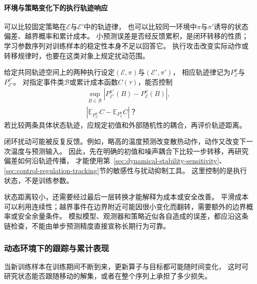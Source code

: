 \paragraph{环境与策略变化下的执行轨迹响应}
\label{sec:future-analysis-trajectory-perturbation}

可以比较固定策略在$\mathcal E$与$\mathcal E'$中的轨迹律，
也可以比较同一环境中$\pi$与$\pi'$诱导的状态偏差、越界概率和累计成本。
小预测误差是否经反馈累积，是闭环转移的性质；
学习参数序列对训练样本的稳定性本身不足以回答它。
执行攻击改变实际动作或转移规律时，也要在这类对象上规定扰动范围。

\begin{mathproblem}[闭环过程对环境与策略变化的响应]
  \label{question:future-trajectory-perturbation}
  给定共同轨迹空间上的两种执行设定$(\mathcal E,\pi)$与$(\mathcal E',\pi')$，
  相应轨迹律记为$P_{\mathcal E}^{\pi}$与$P_{\mathcal E'}^{\pi'}$。
  对指定事件类$\mathcal B$或累计成本函数$C(\tau)$，能否控制
  \[
    \begin{gathered}
      \sup_{B\in\mathcal B}
        |P_{\mathcal E'}^{\pi'}(B)-P_{\mathcal E}^{\pi}(B)|,\\
      |\mathbb E_{P_{\mathcal E'}^{\pi'}}C
       -\mathbb E_{P_{\mathcal E}^{\pi}}C|\text{？}
    \end{gathered}
  \]
  若比较两条具体状态轨迹，应规定初值和外部随机性的耦合，再评价轨迹距离。
\end{mathproblem}

闭环扰动可能被反复反馈。例如，略高的温度预测改变散热动作，动作又改变下一次温度与预测输入。
因此，先在明确的初值和噪声耦合下比较一步转移，再研究偏差如何沿轨迹传播，
才能使用第~\ref{sec:dynamical-stability-sensitivity}、\ref{sec:control-regulation-tracking}节的敏感性与扰动抑制工具。
这里控制的是执行状态，不是训练参数。

状态距离较小，还需要经过最后一层转换才能解释为成本或安全改善。
平滑成本可以利用连续性；越界事件在边界附近可能因很小变化而翻转，需要额外的边界概率或安全余量条件。
模拟模型、观测器和策略近似各自造成的误差，都应沿这条链检查，不能由单步预测精度直接宣称长期行为可靠。

\subsubsection{动态环境下的跟踪与累计表现}
\label{sec:future-analysis-cumulative-comparison}

当新训练样本在训练期间不断到来，更新算子与目标都可能随时间变化，
这时可研究状态能否跟随移动的解集，或者在整个序列上承担了多少损失。

